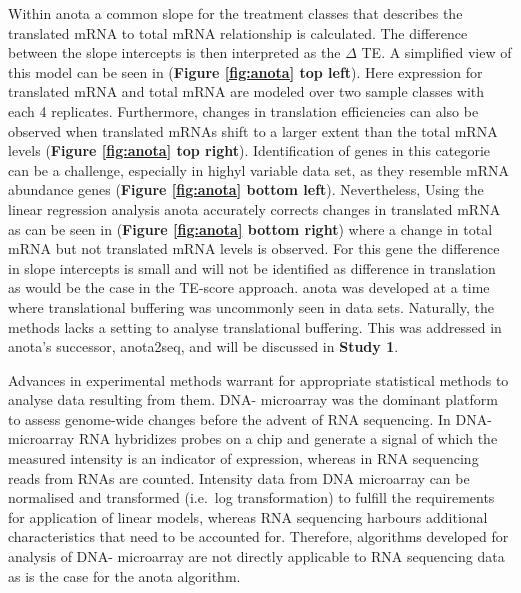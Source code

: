 \documentclass[12pt,openany]{book}
\begin{document}
Within anota a common slope for the treatment classes that describes the
translated mRNA to total mRNA relationship is calculated. The difference
between the slope intercepts is then interpreted as the \(\varDelta\)
TE. A simplified view of this model can be seen in (\textbf{Figure
\ref{fig:anota} top left}). Here expression for translated mRNA and
total mRNA are modeled over two sample classes with each 4 replicates.
Furthermore, changes in translation efficiencies can also be observed
when translated mRNAs shift to a larger extent than the total mRNA
levels (\textbf{Figure \ref{fig:anota} top right}). Identification of
genes in this categorie can be a challenge, especially in highyl
variable data set, as they resemble mRNA abundance genes (\textbf{Figure
\ref{fig:anota} bottom left}). Nevertheless, Using the linear regression
analysis anota accurately corrects changes in translated mRNA as can be
seen in (\textbf{Figure \ref{fig:anota} bottom right}) where a change in
total mRNA but not translated mRNA levels is observed. For this gene the
difference in slope intercepts is small and will not be identified as
difference in translation as would be the case in the TE-score approach.
anota was developed at a time where translational buffering was
uncommonly seen in data sets. Naturally, the methods lacks a setting to
analyse translational buffering. This was addressed in anota's
successor, anota2seq, and will be discussed in \textbf{Study 1}.

Advances in experimental methods warrant for appropriate statistical
methods to analyse data resulting from them. DNA- microarray was the
dominant platform to assess genome-wide changes before the advent of RNA
sequencing. In DNA- microarray RNA hybridizes probes on a chip and
generate a signal of which the measured intensity is an indicator of
expression, whereas in RNA sequencing reads from RNAs are counted.
Intensity data from DNA microarray can be normalised and transformed
(i.e.~log transformation) to fulfill the requirements for application of
linear models, whereas RNA sequencing harbours additional
characteristics that need to be accounted for. Therefore, algorithms
developed for analysis of DNA- microarray are not directly applicable to
RNA sequencing data as is the case for the anota algorithm.
\end{document}
